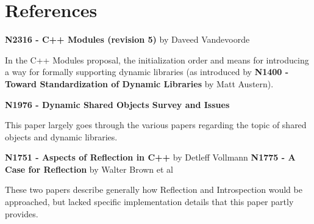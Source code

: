 \section{References}
\textbf{N2316 - C++ Modules (revision 5)} by Daveed Vandevoorde

In the C++ Modules proposal, the initialization order and means for
introducing a way for formally supporting dynamic libraries (as introduced by
\textbf{N1400 - Toward Standardization of Dynamic Libraries} by Matt Austern).

\textbf{N1976 - Dynamic Shared Objects Survey and Issues}

This paper largely goes through the various papers regarding the topic of
shared objects and dynamic libraries.

\textbf{N1751 - Aspects of Reflection in C++} by Detleff Vollmann
\textbf{N1775 - A Case for Reflection} by Walter Brown et al

These two papers describe generally how Reflection and Introspection would be
approached, but lacked specific implementation details that this paper partly
provides.